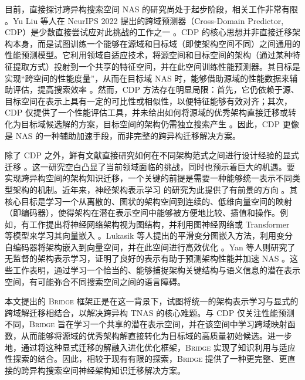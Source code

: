 \documentclass[../main.tex]{subfiles}
\begin{document}
目前，直接探讨跨异构搜索空间 NAS 的研究尚处于起步阶段，相关工作非常有限 。Yu Liu 等人在 NeurIPS 2022 提出的跨域预测器（Cross-Domain Predictor, CDP）是少数直接尝试应对此挑战的工作之一 。CDP 的核心思想并非直接迁移架构本身，而是试图训练一个能够在源域和目标域（即使架构空间不同）之间通用的性能预测模型。它利用领域自适应技术，将源空间和目标空间的架构（通过某种特征提取方式）投射到一个共享的特征空间，并在此空间训练性能预测器。其目标是实现“跨空间的性能度量”，从而在目标域 NAS 时，能够借助源域的性能数据来辅助评估，提高搜索效率 。然而，CDP 方法存在明显局限：首先，它仍依赖于源、目标空间在表示上具有一定的可比性或相似性，以便特征能够有效对齐；其次，CDP 仅提供了一个性能评估工具，并未给出如何将源域的优秀架构直接迁移或转化为目标域候选解的方案，目标空间的架构仍需独立搜索产生 。因此，CDP 更像是 NAS 的一种辅助加速手段，而非完整的跨异构迁移解决方案。

除了 CDP 之外，鲜有文献直接研究如何在不同架构范式之间进行设计经验的显式迁移 。这一研究空白凸显了当前领域面临的挑战，同时也预示着巨大的机遇。要实现跨异构空间的架构知识迁移，一个关键的前提是需要一种能够统一表示不同类型架构的机制。近年来，神经架构表示学习 的研究为此提供了有前景的方向 。其核心目标是学习一个从离散的、图状的架构空间到连续的、低维向量空间的映射（即编码器），使得架构在潜在表示空间中能够被方便地比较、插值和操作。例如，有工作提出将神经网络架构视为图结构，并利用图神经网络或 Transformer 等模型来学习其向量嵌入 。Lukasik 等人提出的平滑变分图嵌入方法，利用变分自编码器将架构嵌入到向量空间，并在此空间进行高效优化 。Yan 等人则研究了无监督的架构表示学习，证明了良好的表示有助于预测架构性能并加速 NAS 。这些工作表明，通过学习一个恰当的、能够捕捉架构关键结构与语义信息的潜在表示空间，有可能弥合不同搜索空间之间的语言障碍。

本文提出的 \textsc{Bridge} 框架正是在这一背景下，试图将统一的架构表示学习与显式的跨域解迁移相结合，以解决跨异构 TNAS 的核心难题。与 CDP 仅关注性能预测不同，\textsc{Bridge} 旨在学习一个共享的潜在表示空间，并在该空间中学习跨域映射函数，从而能够将源域的优秀架构解直接转化为目标域的高质量初始候选。进一步地，通过将这种显式迁移的解融入进化优化框架，\textsc{Bridge} 实现了知识利用与适应性探索的结合。因此，相较于现有有限的探索，\textsc{Bridge} 提供了一种更完整、更直接的跨异构搜索空间神经架构知识迁移解决方案。

\label{sec:ch4-4-transferable-evolutionary-nas-framework}
\end{document}
